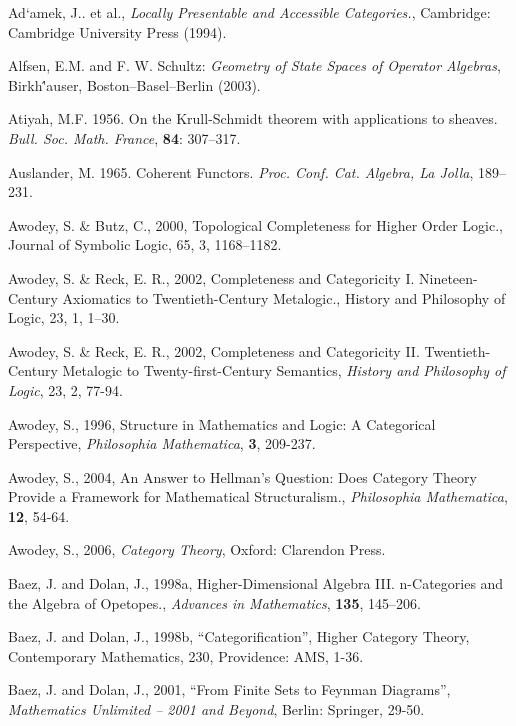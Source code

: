 \documentclass[12pt]{article}
\begin{document}
\begin{thebibliography}{399}

Ad`amek, J.. et al., \emph{Locally Presentable and Accessible Categories.}, Cambridge: Cambridge University Press (1994). 

Alfsen, E.M. and F. W. Schultz: \emph{Geometry of State Spaces of
Operator Algebras}, Birkh\''auser, Boston--Basel--Berlin (2003).

Atiyah, M.F. 1956. On the Krull-Schmidt theorem with applications to sheaves.
\emph{Bull. Soc. Math. France}, \textbf{84}: 307--317.

Auslander, M. 1965. Coherent Functors. \emph{Proc. Conf. Cat. Algebra, La Jolla},
189--231.
  
Awodey, S. \& Butz, C., 2000, Topological Completeness for Higher Order Logic., Journal of Symbolic Logic, 65, 3, 1168--1182. 

Awodey, S. \& Reck, E. R., 2002, Completeness and Categoricity I. 
Nineteen-Century Axiomatics to Twentieth-Century Metalogic., History and Philosophy of Logic, 23, 1, 1--30.
  
Awodey, S. \& Reck, E. R., 2002, Completeness and Categoricity II. Twentieth-Century Metalogic to Twenty-first-Century Semantics, {\em History and Philosophy of Logic}, 23, 2, 77-94.  

Awodey, S., 1996, Structure in Mathematics and Logic: A Categorical Perspective, 
{\em Philosophia Mathematica}, {\bf 3}, 209-237. 

Awodey, S., 2004, An Answer to Hellman's Question: Does Category Theory Provide a Framework for Mathematical Structuralism., {\em Philosophia Mathematica}, {\bf 12}, 54-64. 

Awodey, S., 2006, {\em Category Theory}, Oxford: Clarendon Press. 

Baez, J. and Dolan, J., 1998a, Higher-Dimensional Algebra III. n-Categories and the Algebra of Opetopes.,
{\em Advances in Mathematics}, {\bf 135}, 145--206.  

Baez, J. and Dolan, J., 1998b, ``Categorification'', Higher Category Theory, Contemporary Mathematics, 230, Providence: AMS, 1-36. 

Baez, J. and Dolan, J., 2001, ``From Finite Sets to Feynman Diagrams'', {\em Mathematics Unlimited -- 2001 and Beyond}, Berlin: Springer, 29-50.  


\end{thebibliography}
\end{document}
